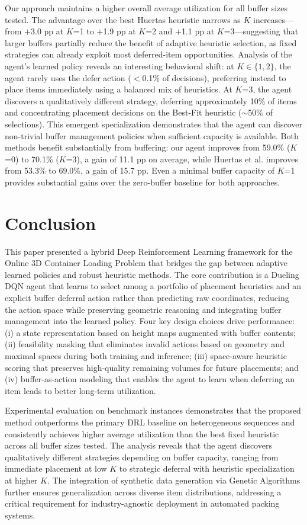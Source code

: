 \documentclass[runningheads]{llncs}
\begin{document}
Our approach maintains a higher overall average utilization for all buffer sizes tested. The advantage over the best Huertas heuristic narrows as $K$ increases---from $+$3.0 pp at $K$=1 to $+$1.9 pp at $K$=2 and $+$1.1 pp at $K$=3---suggesting that larger buffers partially reduce the benefit of adaptive heuristic selection, as fixed strategies can already exploit most deferred-item opportunities. Analysis of the agent's learned policy reveals an interesting behavioral shift: at $K \in \{1, 2\}$, the agent rarely uses the defer action ($<$0.1\% of decisions), preferring instead to place items immediately using a balanced mix of heuristics. At $K$=3, the agent discovers a qualitatively different strategy, deferring approximately 10\% of items and concentrating placement decisions on the Best-Fit heuristic ($\sim$50\% of selections). This emergent specialization demonstrates that the agent can discover non-trivial buffer management policies when sufficient capacity is available. Both methods benefit substantially from buffering: our agent improves from 59.0\% ($K$=0) to 70.1\% ($K$=3), a gain of 11.1 pp on average, while Huertas et al. improves from 53.3\% to 69.0\%, a gain of 15.7 pp. Even a minimal buffer capacity of $K$=1 provides substantial gains over the zero-buffer baseline for both approaches.

\section{Conclusion}
This paper presented a hybrid Deep Reinforcement Learning framework for the Online 3D Container Loading Problem that bridges the gap between adaptive learned policies and robust heuristic methods. The core contribution is a Dueling DQN agent that learns to select among a portfolio of placement heuristics and an explicit buffer deferral action rather than predicting raw coordinates, reducing the action space while preserving geometric reasoning and integrating buffer management into the learned policy. Four key design choices drive performance: (i) a state representation based on height maps augmented with buffer contents; (ii) feasibility masking that eliminates invalid actions based on geometry and maximal spaces during both training and inference; (iii) space-aware heuristic scoring that preserves high-quality remaining volumes for future placements; and (iv) buffer-as-action modeling that enables the agent to learn when deferring an item leads to better long-term utilization.

Experimental evaluation on benchmark instances demonstrates that the proposed method outperforms the primary DRL baseline on heterogeneous sequences and consistently achieves higher average utilization than the best fixed heuristic across all buffer sizes tested. The analysis reveals that the agent discovers qualitatively different strategies depending on buffer capacity, ranging from immediate placement at low $K$ to strategic deferral with heuristic specialization at higher $K$. The integration of synthetic data generation via Genetic Algorithms further ensures generalization across diverse item distributions, addressing a critical requirement for industry-agnostic deployment in automated packing systems.
\end{document}
